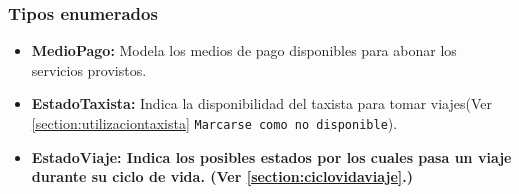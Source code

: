 \subsubsection{Tipos enumerados}
\begin{itemize}
	\item \textbf{MedioPago:} Modela los medios de pago disponibles para abonar los servicios provistos.
	\item \textbf{EstadoTaxista:} Indica la disponibilidad del taxista para tomar viajes(Ver \ref{section:utilizaciontaxista} \texttt{Marcarse como no disponible}).
	\item \textbf{EstadoViaje: Indica los posibles estados por los cuales pasa un viaje durante su ciclo de vida. (Ver \ref{section:ciclovidaviaje}.)}
\end{itemize}